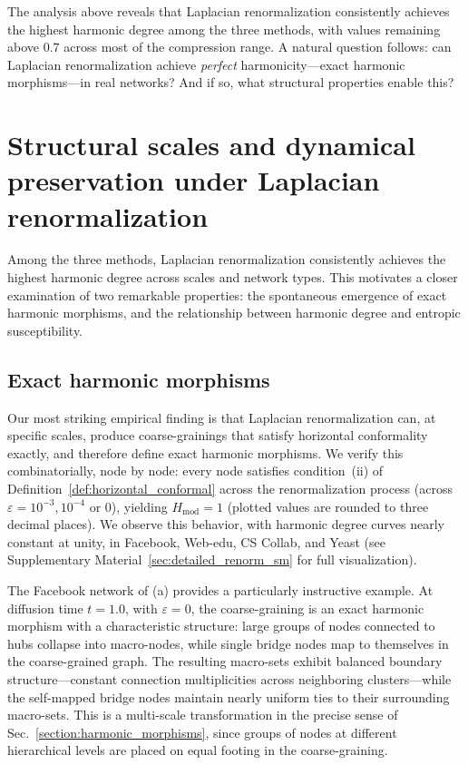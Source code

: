 \documentclass[twocolumn,superscriptaddress,tightenlines,aps,prx,floatfix]{revtex4-2}
\begin{document}
\begin{bibunit}
The analysis above reveals that Laplacian renormalization consistently achieves the highest harmonic degree among the three methods, with values remaining above $0.7$ across most of the compression range. A natural question follows: can Laplacian renormalization achieve \emph{perfect} harmonicity---exact harmonic morphisms---in real networks? And if so, what structural properties enable this?


\section{Structural scales and dynamical preservation under Laplacian renormalization}
\label{section:laplacian_deep}

Among the three methods, Laplacian renormalization consistently achieves the highest harmonic degree across scales and network types. This motivates a closer examination of two remarkable properties: the spontaneous emergence of exact harmonic morphisms, and the relationship between harmonic degree and entropic susceptibility.

\subsection{Exact harmonic morphisms}

Our most striking empirical finding is that Laplacian renormalization can, at specific scales, produce coarse-grainings that satisfy horizontal conformality exactly, and therefore define exact harmonic morphisms. 
We verify this combinatorially, node by node: every node satisfies condition~(ii) of Definition~\ref{def:horizontal_conformal} across the renormalization process (across $ \varepsilon = 10^{-3}, 10^{-4} \text{ or } 0$), yielding $H_{\text{mod}} = 1$ (plotted values are rounded to three decimal places). 
We observe this behavior, with harmonic degree curves nearly constant at unity, in Facebook, Web-edu, CS Collab, and Yeast (see Supplementary Material~\ref{sec:detailed_renorm_sm} for full visualization). 

The Facebook network \cite{traud2012social} of (a) provides a particularly instructive example. 
At diffusion time $t=1.0$, with $\varepsilon = 0$, the coarse-graining is an exact harmonic morphism with a characteristic structure: large groups of nodes connected to hubs collapse into macro-nodes, while single bridge nodes map to themselves in the coarse-grained graph. 
The resulting macro-sets exhibit balanced boundary structure---constant connection multiplicities across neighboring clusters---while the self-mapped bridge nodes maintain nearly uniform ties to their surrounding macro-sets. This is a multi-scale transformation in the precise sense of Sec.~\ref{section:harmonic_morphisms}, since groups of nodes at different hierarchical levels are placed on equal footing in the coarse-graining.


\end{bibunit}
\end{document}

